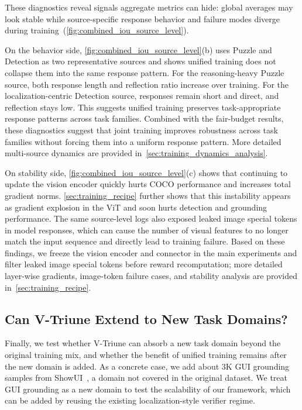 These diagnostics reveal signals aggregate metrics can hide: global averages may look stable while source-specific response behavior and failure modes diverge during training~(\cref{fig:combined_iou_source_level}).

On the behavior side, \cref{fig:combined_iou_source_level}(b) uses Puzzle and Detection as two representative sources and shows unified training does not collapse them into the same response pattern.
%
For the reasoning-heavy Puzzle source, both response length and reflection ratio increase over training.
%
For the localization-centric Detection source, responses remain short and direct, and reflection stays low.
%
This suggests unified training preserves task-appropriate response patterns across task families.
%
Combined with the fair-budget results, these diagnostics suggest that joint training improves robustness across task families without forcing them into a uniform response pattern.
%
More detailed multi-source dynamics are provided in~\cref{sec:training_dynamics_analysis}.

On stability side, \cref{fig:combined_iou_source_level}(c) shows that continuing to update the vision encoder quickly hurts COCO performance and increases total gradient norms.
%
\cref{sec:training_recipe} further shows that this instability appears as gradient explosion in the ViT and soon hurts detection and grounding performance.
%
The same source-level logs also exposed leaked image special tokens in model responses, which can cause the number of visual features to no longer match the input sequence and directly lead to training failure.
%
Based on these findings, we freeze the vision encoder and connector in the main experiments and filter leaked image special tokens before reward recomputation; more detailed layer-wise gradients, image-token failure cases, and stability analysis are provided in~\cref{sec:training_recipe}.

\subsection{Can V-Triune Extend to New Task Domains?}
\label{subsec:gui_extension}

Finally, we test whether V-Triune can absorb a new task domain beyond the original training mix, and whether the benefit of unified training remains after the new domain is added.
%
As a concrete case, we add about 3K GUI grounding samples from ShowUI~\citep{lin2025showui}, a domain not covered in the original dataset.
%
We treat GUI grounding as a new domain to test the scalability of our framework, which can be added by reusing the existing localization-style verifier regime.

